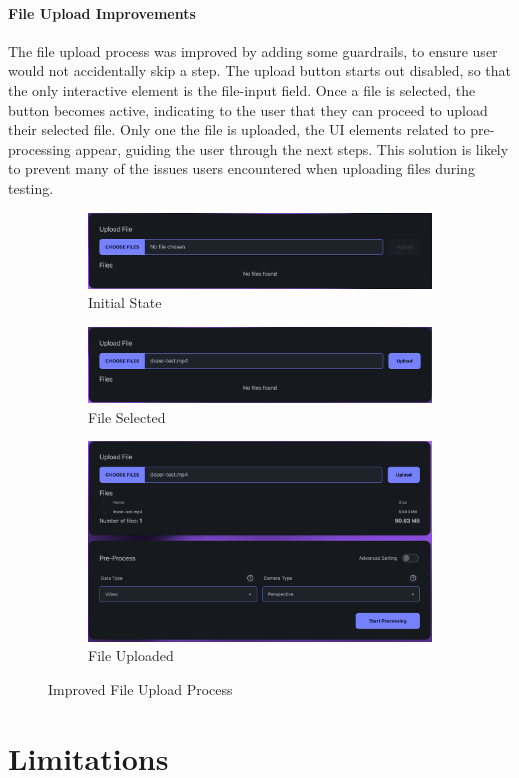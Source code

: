 \paragraph{File Upload Improvements}
The file upload process was improved by adding some guardrails, to ensure user would not accidentally skip a step. 
The upload button starts out disabled, so that the only interactive element is the file-input field.
Once a file is selected, the button becomes active, indicating to the user that they can proceed to upload their selected file.
Only one the file is uploaded, the UI elements related to pre-processing appear, guiding the user through the next steps. 
This solution is likely to prevent many of the issues users encountered when uploading files during testing. 


\begin{figure}[htb]
  \begin{subfigure}{\textwidth}
    \centering
    \includegraphics[width=.8\linewidth]{figures/fix-4.1.png}
    \caption{Initial State}
  \end{subfigure}
  \begin{subfigure}{\textwidth}
    \centering
    \includegraphics[width=.8\linewidth]{figures/fix-4.2.png}
    \caption{File Selected}
  \end{subfigure}
  \begin{subfigure}{\textwidth}
    \centering
    \includegraphics[width=.8\linewidth]{figures/fix-4.3.png}
    \caption{File Uploaded}
  \end{subfigure}
	\caption{Improved File Upload Process}
  \label{fig:fix-4}
\end{figure}

\section{Limitations}
\label{sec:discussion:limitations}
